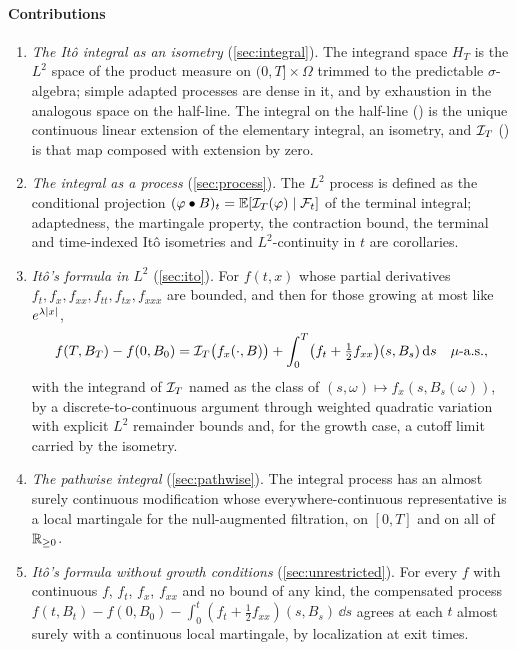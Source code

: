 \documentclass[11pt]{article}
\newcommand{\HT}{H_T}
\newcommand{\bulletB}{\mathbin{\bullet}}
\begin{document}
\paragraph{Contributions}
\begin{enumerate}[label=(\arabic*)]
\item \emph{The It\^o integral as an isometry} (\cref{sec:integral}). The integrand space $\HT$ is the
  $L^2$ space of the product measure on $(0,T]\times\Omega$ trimmed to the predictable $\sigma$-algebra;
  simple adapted processes are dense in it, and by exhaustion in the analogous space on the half-line. The
  integral on the half-line () is the unique continuous linear extension of the elementary
  integral, an isometry, and $\mathcal{I}_T$ () is that map composed with extension by zero.
\item \emph{The integral as a process} (\cref{sec:process}). The $L^2$ process is defined as the conditional
  projection $(\varphi\bulletB B)_t=\E[\ito_T(\varphi)\mid\F_t]$ of the terminal integral; adaptedness, the
  martingale property, the contraction bound, the terminal and time-indexed It\^o isometries and $L^2$-continuity in
  $t$ are corollaries.
\item \emph{It\^o's formula in $L^2$} (\cref{sec:ito}). For $f(t,x)$ whose partial derivatives
  $f_t,f_x,f_{xx},f_{tt},f_{tx},f_{xxx}$ are bounded, and then for those growing at most like
  $e^{\lambda\lvert x\rvert}$,
  \[
    f(T,B_T)-f(0,B_0)=\mathcal{I}_T\bigl(f_x(\cdot,B)\bigr)+\int_0^T\bigl(f_t+\tfrac12f_{xx}\bigr)(s,B_s)\,\mathrm{d} s
    \quad\mu\text{-a.s.},
  \]
  with the integrand of $\mathcal{I}_T$ named as the class of $(s,\omega)\mapsto f_x(s,B_s(\omega))$, by a
  discrete-to-continuous argument through weighted quadratic variation with explicit $L^2$ remainder
  bounds and, for the growth case, a cutoff limit carried by the isometry.
\item \emph{The pathwise integral} (\cref{sec:pathwise}). The integral process has an almost surely
  continuous modification whose everywhere-continuous representative is a local martingale for the
  null-augmented filtration, on $[0,T]$ and on all of $\mathbb{R}_{\ge0}$.
\item \emph{It\^o's formula without growth conditions} (\cref{sec:unrestricted}). For every $f$ with
  continuous $f$, $f_t$, $f_x$, $f_{xx}$ and no bound of any kind, the compensated process
  $f(t,B_t)-f(0,B_0)-\int_0^t(f_t+\tfrac12f_{xx})(s,B_s)\,\dd s$ agrees at each $t$ almost surely with a
  continuous local martingale, by localization at exit times.

\end{enumerate}
\end{document}
